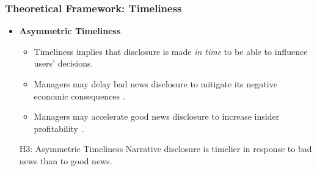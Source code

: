 \documentclass{beamer}
\begin{document}
\begin{frame}
	\frametitle{Theoretical Framework: Timeliness}
	\begin{itemize}
		\item \textbf{Asymmetric Timeliness}
		
		\begin{itemize}
			\item Timeliness implies that disclosure is made \textit{in time} to be able to influence users' decisions. 
			\item Managers may delay bad news disclosure to mitigate its negative economic consequences \citep{chambersTimelinessReportingStock1984, niessnerStrategicDisclosureTiming2015, segalAreManagersStrategic2016, brockbankStrategicTiming8K2018}.
			\item Managers may accelerate good news disclosure to increase insider profitability  \citep{khalilovAccountingConservatismProfitability2020}.
		\end{itemize}
		
		
\medskip
\pause
\begin{block}{H3: Asymmetric Timeliness}
	Narrative disclosure is timelier in response to bad news than to good news.
\end{block}

		
	\end{itemize}
\end{frame}
%
%
%
%
\end{document}
